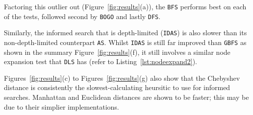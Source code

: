 



Factoring this outlier out (Figure~\ref{fig:results}(a)), the \texttt{BFS} performs
best on each of the tests, followed second by \texttt{BOGO} and lastly \texttt{DFS}.

Similarly, the informed search that is depth-limited (\texttt{IDAS}) is also slower
than its non-depth-limited counterpart \texttt{AS}. Whilst \texttt{IDAS} is still far
improved than \texttt{GBFS} as shown in the summary Figure~\ref{fig:results}(f), it still
involves a similar node expansion test that \texttt{DLS} has (refer to
Listing~\ref{lst:nodeexpand2}).

Figures~\ref{fig:results}(c) to Figures~\ref{fig:results}(g) also show that the Chebyshev
distance is consistently the slowest-calculating heursitic to use for informed
searches. Manhattan and Euclidean distances are shown to be faster; this may
be due to their simplier implementations.
